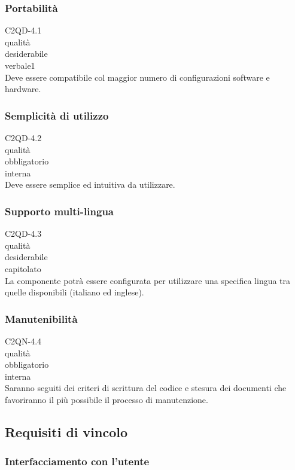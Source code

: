 \subsubsection*{Portabilit\`a}
 C2QD-4.1\\
 qualit\`a \\
 desiderabile \\
 verbale1 \\
Deve essere compatibile col maggior numero di configurazioni software e
hardware.

\subsubsection*{Semplicit\`a di utilizzo}
 C2QD-4.2\\
 qualit\`a \\
 obbligatorio \\
 interna \\
Deve essere semplice ed intuitiva da utilizzare.

\subsubsection*{Supporto multi-lingua}
 C2QD-4.3\\
 qualit\`a \\
 desiderabile \\
 capitolato \\
La componente potr\`a essere configurata per utilizzare una specifica lingua tra
quelle disponibili (italiano ed inglese).

\subsubsection*{Manutenibilit\`a}
 C2QN-4.4\\
 qualit\`a \\
 obbligatorio \\
 interna \\
Saranno seguiti dei criteri di scrittura del codice e stesura dei documenti che
favoriranno il pi\`u possibile il processo di manutenzione.

\subsection{Requisiti di vincolo}
\subsubsection{Interfacciamento con l'utente}
